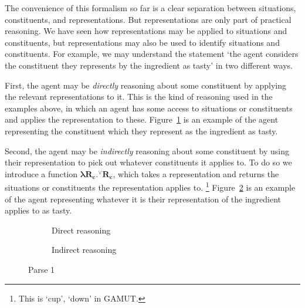 \documentclass[10pt]{article}
\begin{document}
The convenience of this formalism so far is a clear separation between situations, constituents, and representations.
But representations are only part of practical reasoning.
We have seen how representations may be applied to situations and constituents, but representations may also be used to identify situations and constituents.
For example, we may understand the statement `the agent considers the constituent they represents by the ingredient as tasty' in two different ways.

First, the agent may be \emph{directly} reasoning about some constituent by applying the relevant representations to it.
This is the kind of reasoning used in the examples above, in which an agent has some access to situations or constituents and applies the representation to these.
Figure~\ref{ex:tasty:direct} is an example of the agent representing the constituent which they represent as the ingredient as tasty.

Second, the agent may be \emph{indirectly} reasoning about some constituent by using their representation to pick out whatever constituents it applies to.
To do so we introduce a function \(\bm{\lambda R_{c}.^{\lor}R_{c}}\), which takes a representation and returns the situations or constituents the representation applies to.\nolinebreak
\footnote{This is `cup', `down' in GAMUT.}
Figure~\ref{ex:tasty:indirect} is an example of the agent representing whatever it is their representation of the ingredient applies to as tasty.

\begin{figure}[h]
  \hfill
  \begin{subfigure}{0.4\linewidth}
    \caption{Direct reasoning}
    \label{ex:tasty:direct}
  \end{subfigure}
  \hfill
  \begin{subfigure}{0.4\linewidth}
      \caption{Indirect reasoning}
      \label{ex:tasty:indirect}
  \end{subfigure}
  \hfill
  \caption{Parse 1}
  \label{fig:parse:10}
\end{figure}
\end{document}
